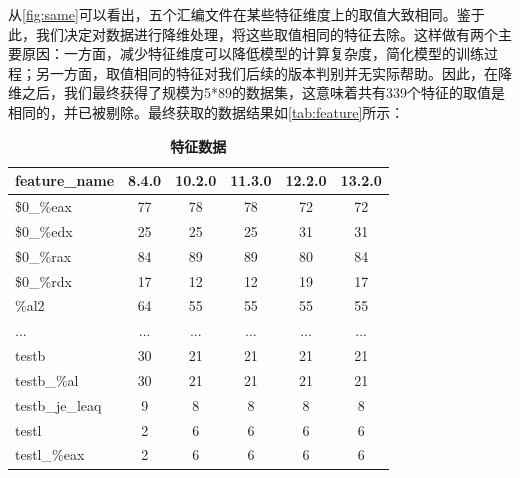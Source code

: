从\autoref{fig:same}可以看出，五个汇编文件在某些特征维度上的取值大致相同。鉴于此，我们决定对数据进行降维处理，将这些取值相同的特征去除。这样做有两个主要原因：一方面，减少特征维度可以降低模型的计算复杂度，简化模型的训练过程；另一方面，取值相同的特征对我们后续的版本判别并无实际帮助。因此，在降维之后，我们最终获得了规模为5*89的数据集，这意味着共有339个特征的取值是相同的，并已被剔除。最终获取的数据结果如\autoref{tab:feature}所示：
\begin{table}[H]
\caption{\textbf{特征数据}}%
\label{tab:feature}
\centering%
\begin{tabular}{lccccc}%
\toprule%
 feature\_name&8.4.0 & 10.2.0 & 11.3.0 & 12.2.0 & 13.2.0 \\
\midrule%
\$0\_\%eax&77&78&78&72&72 \\
\$0\_\%edx&25 & 25 & 25 & 31 & 31 \\
\$0\_\%rax&84 & 89 & 89 & 80 & 84 \\
\$0\_\%rdx&17 & 12 & 12 & 19 & 17 \\
\%al2 & 64 & 55 & 55 & 55&55 \\
...&... & ... & ... & ... & ... \\
testb&30 & 21 & 21 & 21 & 21 \\
testb\_\%al&30 & 21 & 21 & 21 & 21 \\
testb\_je\_leaq&9 & 8 & 8 & 8 & 8 \\
testl&2 & 6 & 6 & 6 & 6 \\
testl\_\%eax&2 & 6 & 6 & 6 & 6 \\
\bottomrule%
\end{tabular}
\end{table}

